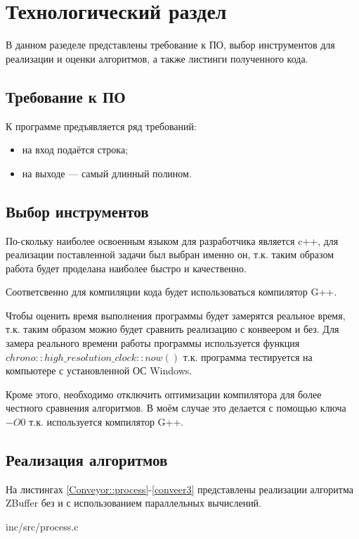 \chapter{Технологический раздел}
В данном разеделе представлены требование к ПО, выбор инструментов для реализации и оценки алгоритмов, а также листинги полученного кода.

\section{Требование к ПО}

К программе предъявляется ряд требований:

\begin{itemize}
	\item на вход подаётся строка;
	\item на выходе — самый длинный полином.
\end{itemize}

\section{Выбор инструментов}
По-скольку наиболее освоенным языком для разработчика является c++, для реализации поставленной задачи был выбран именно он, т.к. таким образом работа будет проделана наиболее быстро и качественно.

Соответсвенно для компиляции кода будет использоваться компилятор G++.

Чтобы оценить время выполнения программы будет замерятся реальное время, т.к. таким образом можно будет сравнить реализацию с конвеером и без. Для замера реального времени работы программы используется функция $chrono::high\_resolution\_clock::now()$ т.к. программа тестируется на компьютере с установленной ОС Windows. \cite{chrono()}

Кроме этого, необходимо отключить оптимизации компилятора для более честного сравнения алгоритмов. В моём случае это делается с помощью ключа $-O0$ т.к. используется компилятор G++. \cite{optimization}

\section{Реализация алгоритмов}
На листингах \ref{Conveyor::process}-\ref{conveer3} представлены реализации алгоритма ZBuffer без и с использованием параллельных вычислений.

\begin{lstinputlisting}[
	caption={Алгоритм главного потока},
	label={Conveyor::process},
	style={c},
	]{inc/src/process.c}
\end{lstinputlisting}

